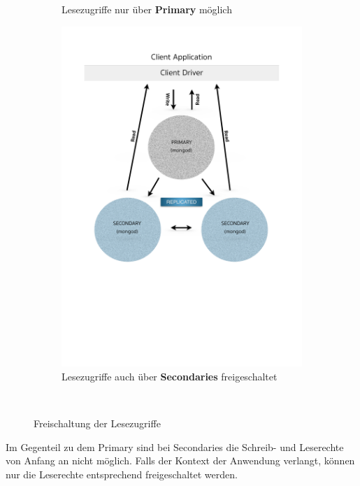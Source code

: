 \begin{figure}[H]
\begin{subfigure}[t]{0.49\textwidth}
	\caption[Lesezugriffe nur über Primary möglich]{Lesezugriffe nur über \textbf{Primary} möglich}
	\label{img:slaveNotOk}
   \end{subfigure}\hfill%
   \begin{subfigure}[t]{0.49\textwidth}\vspace{0pt}
   \centering
	\includegraphics[trim = 0mm 90mm 0mm 20mm, clip, width=1.0\textwidth]{resources/replicaSet/eventualConsistency}
	\caption[Lesezugriffe auch über Secondaries freigeschaltet]{Lesezugriffe auch über \textbf{Secondaries} freigeschaltet}
	\label{img:slaveOk}
   \end{subfigure}\\[5pt]%
   \caption{Freischaltung der Lesezugriffe}
   \label{img:secondariesLowToRead}
\end{figure}
Im Gegenteil zu dem Primary sind bei Secondaries die Schreib- und Leserechte von Anfang an nicht möglich. Falls der Kontext der Anwendung verlangt, können nur die Leserechte entsprechend freigeschaltet werden. 
